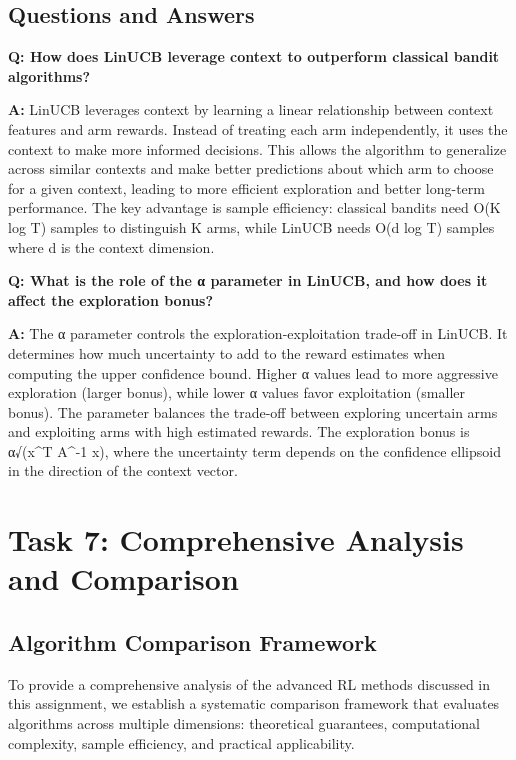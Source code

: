 \documentclass[12pt]{article}
\begin{document}
{{{\subsection{Questions and Answers}

\textbf{Q: How does LinUCB leverage context to outperform classical bandit algorithms?}

\textbf{A:} LinUCB leverages context by learning a linear relationship between context features and arm rewards. Instead of treating each arm independently, it uses the context to make more informed decisions. This allows the algorithm to generalize across similar contexts and make better predictions about which arm to choose for a given context, leading to more efficient exploration and better long-term performance. The key advantage is sample efficiency: classical bandits need O(K log T) samples to distinguish K arms, while LinUCB needs O(d log T) samples where d is the context dimension.

\textbf{Q: What is the role of the α parameter in LinUCB, and how does it affect the exploration bonus?}

\textbf{A:} The α parameter controls the exploration-exploitation trade-off in LinUCB. It determines how much uncertainty to add to the reward estimates when computing the upper confidence bound. Higher α values lead to more aggressive exploration (larger bonus), while lower α values favor exploitation (smaller bonus). The parameter balances the trade-off between exploring uncertain arms and exploiting arms with high estimated rewards. The exploration bonus is α√(x^T A^{-1} x), where the uncertainty term depends on the confidence ellipsoid in the direction of the context vector.

\section{Task 7: Comprehensive Analysis and Comparison}

\subsection{Algorithm Comparison Framework}

To provide a comprehensive analysis of the advanced RL methods discussed in this assignment, we establish a systematic comparison framework that evaluates algorithms across multiple dimensions: theoretical guarantees, computational complexity, sample efficiency, and practical applicability.

}}}
\end{document}
